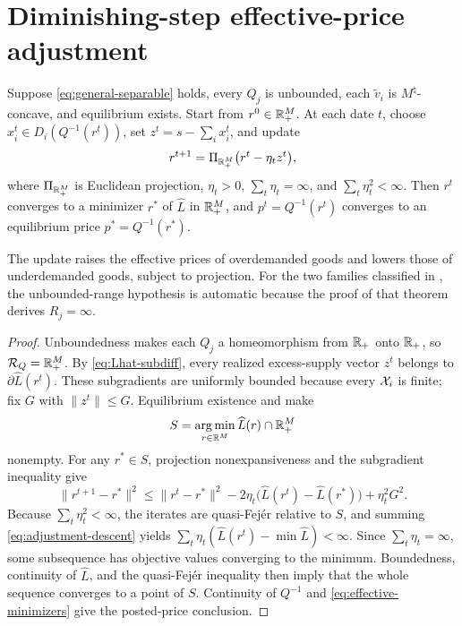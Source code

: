 \section{Diminishing-step effective-price adjustment}\label{app:adjustment}

\begin{lemma}\label{lem:adjustment-convergence}
Suppose \eqref{eq:general-separable} holds, every $Q_j$ is unbounded, each $\widetilde v_i$ is $M^\natural$-concave, and equilibrium exists. Start from $r^0\in\mathbb{R}_+^M$. At each date $t$, choose $x_i^t\in D_i(Q^{-1}(r^t))$, set $z^t=s-\sum_i x_i^t$, and update
\begin{equation}\label{eq:projected-adjustment}
r^{t+1}=\Pi_{\mathbb{R}_+^M}\bigl(r^t-\eta_t z^t\bigr),
\end{equation}
where $\Pi_{\mathbb{R}_+^M}$ is Euclidean projection, $\eta_t>0$, $\sum_t\eta_t=\infty$, and $\sum_t\eta_t^2<\infty$. Then $r^t$ converges to a minimizer $r^*$ of $\widehat L$ in $\mathbb{R}_+^M$, and $p^t=Q^{-1}(r^t)$ converges to an equilibrium price $p^*=Q^{-1}(r^*)$.
\end{lemma}

The update raises the effective prices of overdemanded goods and lowers those of underdemanded goods, subject to projection. For the two families classified in , the unbounded-range hypothesis is automatic because the proof of that theorem derives $R_j=\infty$.

\begin{proof}
Unboundedness makes each $Q_j$ a homeomorphism from $\mathbb{R}_+$ onto $\mathbb{R}_+$, so $\mathcal R_Q=\mathbb{R}_+^M$. By \eqref{eq:Lhat-subdiff}, every realized excess-supply vector $z^t$ belongs to $\partial\widehat L(r^t)$. These subgradients are uniformly bounded because every $\mathcal{X}_i$ is finite; fix $G$ with $\lVert z^t\rVert\le G$. Equilibrium existence and  make
\[
S=\operatorname*{arg\,min}_{r\in\mathbb{R}^M}\widehat L(r)\cap\mathbb{R}_+^M
\]
nonempty. For any $r^*\in S$, projection nonexpansiveness and the subgradient inequality give
\begin{equation}\label{eq:adjustment-descent}
\lVert r^{t+1}-r^*\rVert^2
\le
\lVert r^t-r^*\rVert^2
-2\eta_t\bigl(\widehat L(r^t)-\widehat L(r^*)\bigr)
+\eta_t^2G^2.
\end{equation}
Because $\sum_t\eta_t^2<\infty$, the iterates are quasi-Fej\'er relative to $S$, and summing \eqref{eq:adjustment-descent} yields
$\sum_t\eta_t(\widehat L(r^t)-\min\widehat L)<\infty$.
Since $\sum_t\eta_t=\infty$, some subsequence has objective values converging to the minimum. Boundedness, continuity of $\widehat L$, and the quasi-Fej\'er inequality then imply that the whole sequence converges to a point of $S$. Continuity of $Q^{-1}$ and \eqref{eq:effective-minimizers} give the posted-price conclusion.
\end{proof}

